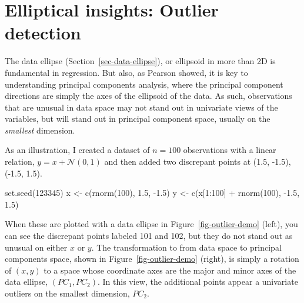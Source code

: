 \documentclass[
  letterpaper,
  10pt,
  krantz2]{krantz}
\makeatletter
\newenvironment{Shaded}{\begin{snugshade}}{\end{snugshade}}
\newcommand{\DecValTok}[1]{\textcolor[rgb]{0.68,0.00,0.00}{#1}}
\newcommand{\FloatTok}[1]{\textcolor[rgb]{0.68,0.00,0.00}{#1}}
\newcommand{\FunctionTok}[1]{\textcolor[rgb]{0.28,0.35,0.67}{#1}}
\newcommand{\NormalTok}[1]{\textcolor[rgb]{0.00,0.23,0.31}{#1}}
\newcommand{\OtherTok}[1]{\textcolor[rgb]{0.00,0.23,0.31}{#1}}
\newcommand{\SpecialCharTok}[1]{\textcolor[rgb]{0.37,0.37,0.37}{#1}}
\newenvironment{kframe}{%
  \medskip{}
  \setlength{\fboxsep}{.8em}
  \def\at@end@of@kframe{}%
  \ifinner\ifhmode%
  \def\at@end@of@kframe{\end{minipage}}%
  \begin{minipage}{\columnwidth}%
  \fi\fi%
  \def\FrameCommand##1{\hskip\@totalleftmargin \hskip-\fboxsep
  \colorbox{shadecolor}{##1}\hskip-\fboxsep
      \hskip-\linewidth \hskip-\@totalleftmargin \hskip\columnwidth}%
  \MakeFramed {\advance\hsize-\width
    \@totalleftmargin\z@ \linewidth\hsize
    \@setminipage}}%
{\par\unskip\endMakeFramed%
  \at@end@of@kframe}
\renewenvironment{Shaded}{\begin{kframe}}{\end{kframe}}
\makeatother
\begin{document}
\section{Elliptical insights: Outlier
detection}\label{elliptical-insights-outlier-detection}

The data ellipse (Section~\ref{sec-data-ellipse}), or ellipsoid in more
than 2D is fundamental in regression. But also, as Pearson showed, it is
key to understanding principal components analysis, where the principal
component directions are simply the axes of the ellipsoid of the data.
As such, observations that are unusual in data space may not stand out
in univariate views of the variables, but will stand out in principal
component space, usually on the \emph{smallest} dimension.

As an illustration, I created a dataset of \(n = 100\) observations with
a linear relation, \(y = x + \mathcal{N}(0, 1)\) and then added two
discrepant points at (1.5, -1.5), (-1.5, 1.5).

\begin{Shaded}
\begin{Highlighting}[]
\FunctionTok{set.seed}\NormalTok{(}\DecValTok{123345}\NormalTok{)}
\NormalTok{x }\OtherTok{\textless{}{-}} \FunctionTok{c}\NormalTok{(}\FunctionTok{rnorm}\NormalTok{(}\DecValTok{100}\NormalTok{),             }\FloatTok{1.5}\NormalTok{, }\SpecialCharTok{{-}}\FloatTok{1.5}\NormalTok{)}
\NormalTok{y }\OtherTok{\textless{}{-}} \FunctionTok{c}\NormalTok{(x[}\DecValTok{1}\SpecialCharTok{:}\DecValTok{100}\NormalTok{] }\SpecialCharTok{+} \FunctionTok{rnorm}\NormalTok{(}\DecValTok{100}\NormalTok{), }\SpecialCharTok{{-}}\FloatTok{1.5}\NormalTok{, }\FloatTok{1.5}\NormalTok{)}
\end{Highlighting}
\end{Shaded}

When these are plotted with a data ellipse in
Figure~\ref{fig-outlier-demo} (left), you can see the discrepant points
labeled 101 and 102, but they do not stand out as unusual on either
\(x\) or \(y\). The transformation to from data space to principal
components space, shown in Figure~\ref{fig-outlier-demo} (right), is
simply a rotation of \((x, y)\) to a space whose coordinate axes are the
major and minor axes of the data ellipse, \((PC_1, PC_2)\). In this
view, the additional points appear a univariate outliers on the smallest
dimension, \(PC_2\).
\end{document}
